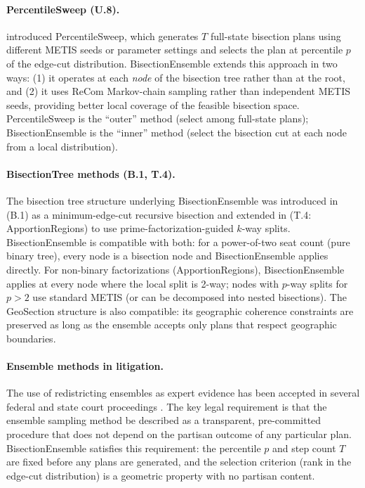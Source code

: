 \paragraph{PercentileSweep (U.8).}
\citet{dellaLibera2026percentilesweep} introduced PercentileSweep, which
generates $T$ full-state bisection plans using different METIS seeds or
parameter settings and selects the plan at percentile $p$ of the edge-cut
distribution. BisectionEnsemble extends this approach in two ways: (1) it
operates at each \emph{node} of the bisection tree rather than at the root,
and (2) it uses ReCom Markov-chain sampling rather than independent METIS
seeds, providing better local coverage of the feasible bisection space.
PercentileSweep is the ``outer'' method (select among full-state plans);
BisectionEnsemble is the ``inner'' method (select the bisection cut at each
node from a local distribution).

\paragraph{BisectionTree methods (B.1, T.4).}
The bisection tree structure underlying BisectionEnsemble was introduced in
\citet{dellaLibera2026mec} (B.1) as a minimum-edge-cut recursive bisection
and extended in \citet{dellaLibera2026apportion} (T.4: ApportionRegions)
to use prime-factorization-guided $k$-way splits. BisectionEnsemble is
compatible with both: for a power-of-two seat count (pure binary tree),
every node is a bisection node and BisectionEnsemble applies directly. For
non-binary factorizations (ApportionRegions), BisectionEnsemble applies
at every node where the local split is 2-way; nodes with $p$-way splits
for $p > 2$ use standard METIS (or can be decomposed into nested bisections).
The GeoSection structure \citep{dellaLibera2026geosection} is also compatible:
its geographic coherence constraints are preserved as long as the ensemble
accepts only plans that respect geographic boundaries.

\paragraph{Ensemble methods in litigation.}
The use of redistricting ensembles as expert evidence has been accepted in
several federal and state court proceedings \citep{herschlag2020quantifying,
duchin2021report}. The key legal requirement is that the ensemble sampling
method be described as a transparent, pre-committed procedure that does not
depend on the partisan outcome of any particular plan. BisectionEnsemble
satisfies this requirement: the percentile $p$ and step count $T$ are fixed
before any plans are generated, and the selection criterion (rank in the
edge-cut distribution) is a geometric property with no partisan content.
